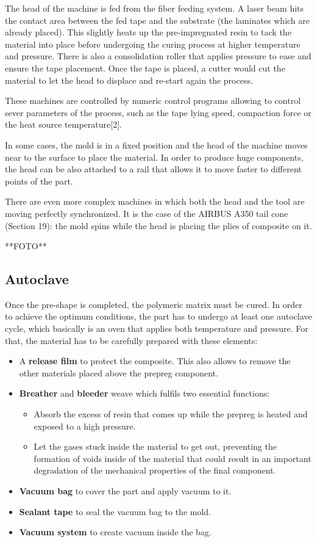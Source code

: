 The head of the machine is fed from the fiber feeding system. A laser beam hits the contact area between the fed tape and the substrate (the laminates which are already placed). This slightly heats up the pre-impregnated resin to tack the material into place before undergoing the curing process at higher temperature and pressure. There is also a consolidation roller that applies pressure to ease and ensure the tape placement. Once the tape is placed, a cutter would cut the material to let the head to displace and re-start again the process.

These machines are controlled by numeric control programs allowing to control sever parameters of the process, such as the tape lying speed, compaction force or the heat source temperature[2].

In some cases, the mold is in a fixed position and the head of the machine moves near to the surface to place the material. In order to produce huge components, the head can be also attached to a rail that allows it to move faster to different points of the part.

There are even more complex machines in which both the head and the tool are moving perfectly synchronized. It is the case of the AIRBUS A350 tail cone (Section 19): the mold spins while the head is placing the plies of composite on it.

**FOTO**

\subsection{Autoclave}

Once the pre-shape is completed, the polymeric matrix must be cured. In order to achieve the optimum conditions, the part has to undergo at least one autoclave cycle, which basically is an oven that applies both temperature and pressure. For that, the material has to be carefully prepared with these elements:
\begin{itemize}
\item A \textbf{release film} to protect the composite. This also allows to remove the other materials placed above the prepreg component.
\item \textbf{Breather} and \textbf{bleeder} weave which fulfils two essential functions:
\begin{itemize}
\item Absorb the excess of resin that comes up while the prepreg is heated and exposed to a high pressure.
\item Let the gases stuck inside the material to get out, preventing the formation of voids inside of the material that could result in an important degradation of the mechanical properties of the final component.
\end{itemize}
\item \textbf{Vacuum bag} to cover the part and apply vacuum to it.
\item \textbf{Sealant tape} to seal the vacuum bag to the mold.
\item \textbf{Vacuum system} to create vacuum inside the bag.
\end{itemize}

